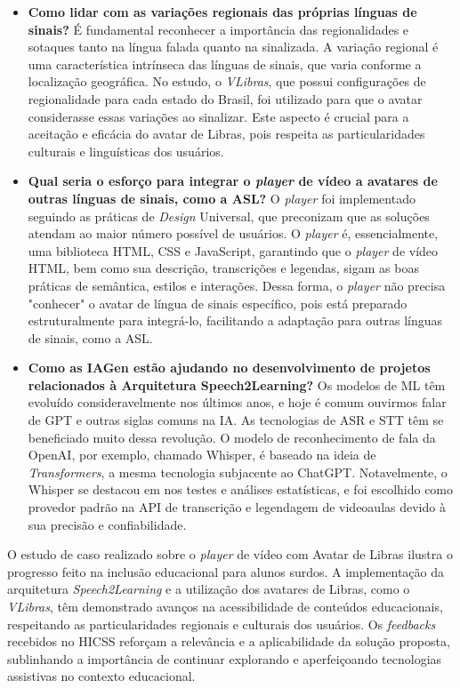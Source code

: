 \begin{itemize}
    \item \textbf{Como lidar com as variações regionais das próprias línguas de sinais?}
    É fundamental reconhecer a importância das regionalidades e sotaques tanto na língua falada quanto na sinalizada. A variação regional é uma característica intrínseca das línguas de sinais, que varia conforme a localização geográfica. No estudo, o \textit{VLibras}, que possui configurações de regionalidade para cada estado do Brasil, foi utilizado para que o avatar considerasse essas variações ao sinalizar. Este aspecto é crucial para a aceitação e eficácia do avatar de Libras, pois respeita as particularidades culturais e linguísticas dos usuários.
    \item \textbf{Qual seria o esforço para integrar o \textit{player} de vídeo a avatares de outras línguas de sinais, como a ASL?}
    O \textit{player} foi implementado seguindo as práticas de \textit{Design} Universal, que preconizam que as soluções atendam ao maior número possível de usuários. O \textit{player} é, essencialmente, uma biblioteca HTML, CSS e JavaScript, garantindo que o \textit{player} de vídeo HTML, bem como sua descrição, transcrições e legendas, sigam as boas práticas de semântica, estilos e interações. Dessa forma, o \textit{player} não precisa "conhecer" o avatar de língua de sinais específico, pois está preparado estruturalmente para integrá-lo, facilitando a adaptação para outras línguas de sinais, como a ASL.
    \item \textbf{Como as IAGen estão ajudando no desenvolvimento de projetos relacionados à Arquitetura Speech2Learning?}
    Os modelos de ML têm evoluído consideravelmente nos últimos anos, e hoje é comum ouvirmos falar de GPT e outras siglas comuns na IA. As tecnologias de ASR e STT têm se beneficiado muito dessa revolução. O modelo de reconhecimento de fala da OpenAI, por exemplo, chamado Whisper, é baseado na ideia de \textit{Transformers}, a mesma tecnologia subjacente ao ChatGPT. Notavelmente, o Whisper se destacou em nos testes e análises estatísticas, e foi escolhido como provedor padrão na API de transcrição e legendagem de videoaulas devido à sua precisão e confiabilidade.
\end{itemize}

O estudo de caso realizado sobre o \textit{player} de vídeo com Avatar de Libras ilustra o progresso feito na inclusão educacional para alunos surdos. A implementação da arquitetura \textit{Speech2Learning} e a utilização dos avatares de Libras, como o \textit{VLibras}, têm demonstrado avanços na acessibilidade de conteúdos educacionais, respeitando as particularidades regionais e culturais dos usuários. Os \textit{feedbacks} recebidos no HICSS reforçam a relevância e a aplicabilidade da solução proposta, sublinhando a importância de continuar explorando e aperfeiçoando tecnologias assistivas no contexto educacional.

